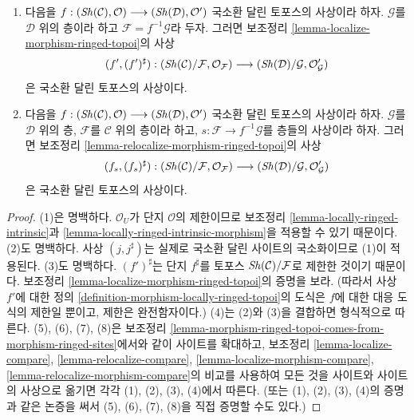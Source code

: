 \begin{lemma}
\begin{enumerate}
$$
(j, j^\sharp) :
(\Sh(\mathcal{C})/\mathcal{G}, \mathcal{O}_\mathcal{G})
\longrightarrow
(\Sh(\mathcal{C})/\mathcal{F}, \mathcal{O}_\mathcal{F})
$$
은 국소환 달린 토포스의 사상이다.
\item 다음을
$f :
(\mathop{\mathit{Sh}}\nolimits(\mathcal{C}), \mathcal{O})
\longrightarrow
(\mathop{\mathit{Sh}}\nolimits(\mathcal{D}), \mathcal{O}')$
국소환 달린 토포스의 사상이라 하자. $\mathcal{G}$를 $\mathcal{D}$ 위의
층이라 하고 $\mathcal{F} = f^{-1}\mathcal{G}$라 두자. 그러면 보조정리
\ref{lemma-localize-morphism-ringed-topoi}의 사상
$$
(f', (f')^\sharp) :
(\mathop{\mathit{Sh}}\nolimits(\mathcal{C})/\mathcal{F}, \mathcal{O}_\mathcal{F})
\longrightarrow
(\mathop{\mathit{Sh}}\nolimits(\mathcal{D})/\mathcal{G}, \mathcal{O}'_\mathcal{G})
$$
은 국소환 달린 토포스의 사상이다.
\item 다음을
$f :
(\mathop{\mathit{Sh}}\nolimits(\mathcal{C}), \mathcal{O})
\longrightarrow
(\mathop{\mathit{Sh}}\nolimits(\mathcal{D}), \mathcal{O}')$
국소환 달린 토포스의 사상이라 하자. $\mathcal{G}$를 $\mathcal{D}$ 위의
층, $\mathcal{F}$를 $\mathcal{C}$ 위의 층이라 하고,
$s : \mathcal{F} \to f^{-1}\mathcal{G}$를 층들의 사상이라 하자.
그러면 보조정리 \ref{lemma-relocalize-morphism-ringed-topoi}의 사상
$$
(f_s, (f_s)^\sharp) :
(\mathop{\mathit{Sh}}\nolimits(\mathcal{C})/\mathcal{F}, \mathcal{O}_\mathcal{F})
\longrightarrow
(\mathop{\mathit{Sh}}\nolimits(\mathcal{D})/\mathcal{G}, \mathcal{O}'_\mathcal{G})
$$
은 국소환 달린 토포스의 사상이다.
\end{enumerate}
\end{lemma}

\begin{proof}
(1)은 명백하다. $\mathcal{O}_U$가 단지 $\mathcal{O}$의 제한이므로
보조정리 \ref{lemma-locally-ringed-intrinsic}과
\ref{lemma-locally-ringed-intrinsic-morphism}을 적용할 수 있기 때문이다.
(2)도 명백하다. 사상 $(j, j^\sharp)$는 실제로 국소환 달린 사이트의
국소화이므로 (1)이 적용된다. (3)도 명백하다. $(f')^\sharp$는 단지
$f^\sharp$를 토포스 $\mathop{\mathit{Sh}}\nolimits(\mathcal{C})/\mathcal{F}$로 제한한 것이기
때문이다. 보조정리 \ref{lemma-localize-morphism-ringed-topoi}의 증명을 보라.
(따라서 사상 $f'$에 대한 정의
\ref{definition-morphism-locally-ringed-topoi}의 도식은 $f$에 대한
대응 도식의 제한일 뿐이고, 제한은 완전함자이다.)
(4)는 (2)와 (3)을 결합하면 형식적으로 따른다.
(5), (6), (7), (8)은 보조정리
\ref{lemma-morphism-ringed-topoi-comes-from-morphism-ringed-sites}에서와 같이
사이트를 확대하고, 보조정리 \ref{lemma-localize-compare},
\ref{lemma-relocalize-compare}, \ref{lemma-localize-morphism-compare},
\ref{lemma-relocalize-morphism-compare}의 비교를 사용하여 모든 것을
사이트와 사이트의 사상으로 옮기면 각각 (1), (2), (3), (4)에서 따른다.
(또는 (1), (2), (3), (4)의 증명과 같은 논증을 써서
(5), (6), (7), (8)을 직접 증명할 수도 있다.)
\end{proof}






